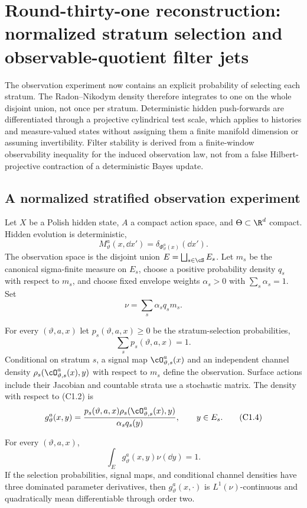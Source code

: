 \section{Round-thirty-one reconstruction: normalized stratum selection and observable-quotient filter jets}
\label{sec:r31-c1}

The observation experiment now contains an explicit probability of selecting
each stratum.  The Radon--Nikodym density therefore integrates to one on the
whole disjoint union, not once per stratum.  Deterministic hidden
push-forwards are differentiated through a projective cylindrical test scale,
which applies to histories and measure-valued states without assigning them a
finite manifold dimension or assuming invertibility.  Filter stability is
derived from a finite-window observability inequality for the induced
observation law, not from a false Hilbert-projective contraction of a
deterministic Bayes update.

\subsection{A normalized stratified observation experiment}

Let $X$ be a Polish hidden state, $A$ a compact action space, and
$\Theta\subset\R^d$ compact.  Hidden evolution is deterministic,
\[
 M_\vartheta^a(x,\dd x')=\delta_{\Phi_\vartheta^a(x)}(\dd x').           \tag{C1.1}
\]
The observation space is the disjoint union
$E=\bigsqcup_{s\in\cS}E_s$.  Let $m_s$ be the canonical sigma-finite measure
on $E_s$, choose a positive probability density $q_s$ with respect to $m_s$,
and choose fixed envelope weights $\alpha_s>0$ with
$\sum_s\alpha_s=1$.  Set
\[
 \nu=\sum_s\alpha_sq_sm_s.                              \tag{C1.2}
\]

For every $(\vartheta,a,x)$ let
$p_s(\vartheta,a,x)\ge0$ be the stratum-selection probabilities,
\[
 \sum_s p_s(\vartheta,a,x)=1.                             \tag{C1.3}
\]
Conditional on stratum $s$, a signal map
$\cO_{\vartheta,s}^a(x)$ and an independent channel density
$\rho_s(\cO_{\vartheta,s}^a(x),y)$ with respect to $m_s$ define the
observation.  Surface actions include their Jacobian and countable strata use
a stochastic matrix.  The density with respect to (C1.2) is
\[
 g_\vartheta^a(x,y)=
 {p_s(\vartheta,a,x)\rho_s(\cO_{\vartheta,s}^a(x),y)
  \over\alpha_s q_s(y)},\qquad y\in E_s.                 \tag{C1.4}
\]

\begin{proposition}
\label{prop:r31-c1-normalization}
For every $(\vartheta,a,x)$,
\[
 \int_Eg_\vartheta^a(x,y)\nu(\dd y)=1.                   \tag{C1.5}
\]
If the selection probabilities, signal maps, and conditional channel
densities have three dominated parameter derivatives, then
$g_\vartheta^a(x,\cdot)$ is $L^1(\nu)$-continuous and quadratically mean
differentiable through order two.
\end{proposition}

